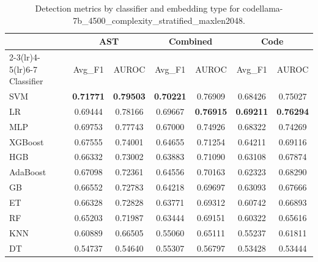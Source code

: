 \begin{table}[t]
\centering
\caption{Detection metrics by classifier and embedding type for codellama-7b\_4500\_complexity\_stratified\_maxlen2048.}
\label{tab:rq2d_codellama-7b_4500_complexity_stratified_maxlen2048}
\begin{tabular}{l cc cc cc}
\toprule
 & \multicolumn{2}{c}{AST} & \multicolumn{2}{c}{Combined} & \multicolumn{2}{c}{Code} \\
\cmidrule(lr){2-3}\cmidrule(lr){4-5}\cmidrule(lr){6-7}
Classifier & Avg\_F1 & AUROC & Avg\_F1 & AUROC & Avg\_F1 & AUROC \\
\midrule
SVM & \textbf{0.71771} & \textbf{0.79503} & \textbf{0.70221} & 0.76909 & 0.68426 & 0.75027 \\
LR & 0.69444 & 0.78166 & 0.69667 & \textbf{0.76915} & \textbf{0.69211} & \textbf{0.76294} \\
MLP & 0.69753 & 0.77743 & 0.67000 & 0.74926 & 0.68322 & 0.74269 \\
XGBoost & 0.67555 & 0.74001 & 0.64655 & 0.71254 & 0.64211 & 0.69116 \\
HGB & 0.66332 & 0.73002 & 0.63883 & 0.71090 & 0.63108 & 0.67874 \\
AdaBoost & 0.67098 & 0.72361 & 0.64556 & 0.70163 & 0.62323 & 0.68290 \\
GB & 0.66552 & 0.72783 & 0.64218 & 0.69697 & 0.63093 & 0.67666 \\
ET & 0.66328 & 0.72828 & 0.63771 & 0.69312 & 0.60742 & 0.66893 \\
RF & 0.65203 & 0.71987 & 0.63444 & 0.69151 & 0.60322 & 0.65616 \\
KNN & 0.60889 & 0.66505 & 0.55060 & 0.65111 & 0.55237 & 0.61811 \\
DT & 0.54737 & 0.54640 & 0.55307 & 0.56797 & 0.53428 & 0.53444 \\
\bottomrule
\end{tabular}
\end{table}
